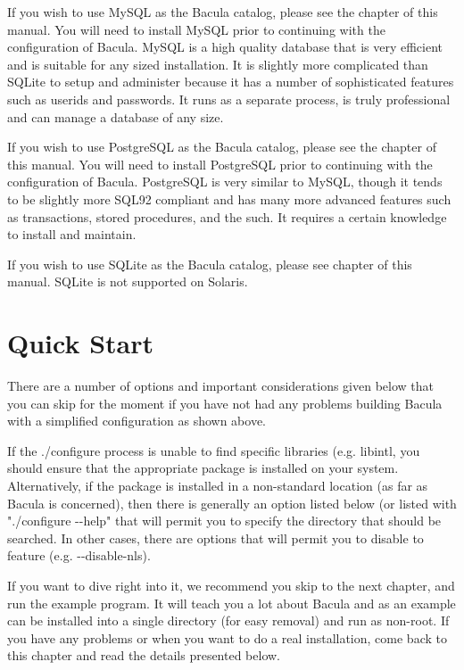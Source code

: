 If you wish to use MySQL as the Bacula catalog, please see the 
 chapter of
this manual. You will need to install MySQL prior to continuing with the
configuration of Bacula. MySQL is a high quality database that is very
efficient and is suitable for any sized installation. It is slightly more
complicated than SQLite to setup and administer because it has a number of
sophisticated features such as userids and passwords. It runs as a separate
process, is truly professional and can manage a database of any size. 

If you wish to use PostgreSQL as the Bacula catalog, please see the 
chapter of this manual. You will need to install PostgreSQL prior to
continuing with the configuration of Bacula. PostgreSQL is very similar to
MySQL, though it tends to be slightly more SQL92 compliant and has many more
advanced features such as transactions, stored procedures, and the such. It
requires a certain knowledge to install and maintain. 

If you wish to use SQLite as the Bacula catalog, please see 
 chapter of
this manual. SQLite is not supported on Solaris.

\section{Quick Start}

There are a number of options and important considerations given below
that you can skip for the moment if you have not had any problems building
Bacula with a simplified configuration as shown above. 
      
If the ./configure process is unable to find specific libraries (e.g.    
libintl, you should ensure that the appropriate package is installed on
your system. Alternatively, if the package is installed in a non-standard
location (as far as Bacula is concerned), then there is generally an
option listed below (or listed with "./configure {-}{-}help" that will
permit you to specify the directory that should be searched. In other
cases, there are options that will permit you to disable to feature 
(e.g. {-}{-}disable-nls).

If you want to dive right into it, we recommend you skip to the next chapter,
and run the example program. It will teach you a lot about Bacula and as an
example can be installed into a single directory (for easy removal) and run as
non-root. If you have any problems or when you want to do a real installation,
come back to this chapter and read the details presented below. 

